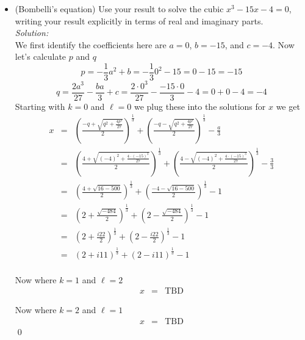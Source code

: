 \documentclass[10pt]{amsart}
\theoremstyle{nonumberplain}
\begin{document}
\begin{enumerate}[label={\bf {\arabic*}:}]
\begin{itemize}
\item (Bombelli's equation) Use your result to solve the cubic $x^3-15
  x-4=0$, writing your result explicitly in terms of real and
  imaginary parts. \\
\textit{Solution:} \\
We first identify the coefficients here are $a=0$, $b=-15$, and $c=-4$.
Now let's calculate $p$ and $q$
$$p = -\frac{1}{3}a^2 + b = -\frac{1}{3}0^2 -15 = 0 -15 = -15$$
$$q = \frac{2a^3}{27} - \frac{ba}{3} + c = \frac{2 \cdot 0^3}{27} - \frac{-15 \cdot 0}{3} - 4 = 0 + 0 -4 = -4$$
Starting with $k = 0$ and $\ell = 0$ we plug these into the solutions for $x$ we get
\begin{eqnarray*}
x &=& \left(\frac{-q + \sqrt{q^2 + \frac{4p^3}{27}}}{2}\right)^{\frac{1}{3}} + \left(\frac{-q - \sqrt{q^2 + \frac{4p^3}{27}}}{2}\right)^{\frac{1}{3}} -\frac{a}{3} \\
   &=& \left(\frac{4 + \sqrt{(-4)^2 + \frac{4 \cdot (-15)^3}{27}}}{2}\right)^{\frac{1}{3}} + \left(\frac{4 - \sqrt{(-4)^2 + \frac{4 \cdot (-15)^3}{27}}}{2}\right)^{\frac{1}{3}} -\frac{3}{3} \\
   &=& \left(\frac{4 + \sqrt{16 - 500}}{2}\right)^{\frac{1}{3}} + \left(\frac{-4 - \sqrt{16 - 500}}{2}\right)^{\frac{1}{3}} -1 \\
   &=& \left(2 + \frac{\sqrt{-484}}{2}\right)^{\frac{1}{3}} + \left(2 - \frac{\sqrt{-484}}{2}\right)^{\frac{1}{3}} -1 \\
   &=& \left(2 + \frac{i22}{2}\right)^{\frac{1}{3}} + \left(2 - \frac{i22}{2}\right)^{\frac{1}{3}} -1 \\
   &=& \left(2 + i11\right)^{\frac{1}{3}} + \left(2 - i11\right)^{\frac{1}{3}} -1 \\
\end{eqnarray*}

Now where $k=1$ and $\ell=2$
\begin{eqnarray*}
x &=& \text{TBD}
\end{eqnarray*}

Now where $k=2$ and $\ell=1$
\begin{eqnarray*}
x &=& \text{TBD}
\end{eqnarray*}
\qed
  \end{itemize}



\end{enumerate}
\end{document}
